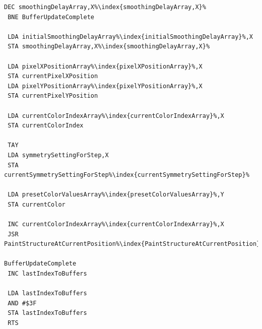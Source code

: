 \begin{minipage}[b]{0.33\linewidth}
\begin{lrbox}{\mybox}
\begin{lstlisting}[basicstyle=\ttfamily\tiny,escapechar=\%]
 DEC smoothingDelayArray,X%\index{smoothingDelayArray,X}%
 BNE BufferUpdateComplete

 LDA initialSmoothingDelayArray%\index{initialSmoothingDelayArray}%,X
 STA smoothingDelayArray,X%\index{smoothingDelayArray,X}%

 LDA pixelXPositionArray%\index{pixelXPositionArray}%,X
 STA currentPixelXPosition
 LDA pixelYPositionArray%\index{pixelYPositionArray}%,X
 STA currentPixelYPosition

 LDA currentColorIndexArray%\index{currentColorIndexArray}%,X
 STA currentColorIndex

 TAY 
 LDA symmetrySettingForStep,X
 STA currentSymmetrySettingForStep%\index{currentSymmetrySettingForStep}%

 LDA presetColorValuesArray%\index{presetColorValuesArray}%,Y
 STA currentColor

 INC currentColorIndexArray%\index{currentColorIndexArray}%,X
 JSR PaintStructureAtCurrentPosition%\index{PaintStructureAtCurrentPosition}%

BufferUpdateComplete   
 INC lastIndexToBuffers

 LDA lastIndexToBuffers
 AND #$3F
 STA lastIndexToBuffers
 RTS 

\end{lstlisting}
\end{lrbox}%
\scalebox{0.8}{\usebox{\mybox}}
\end{minipage}
\hspace{0.5cm}
